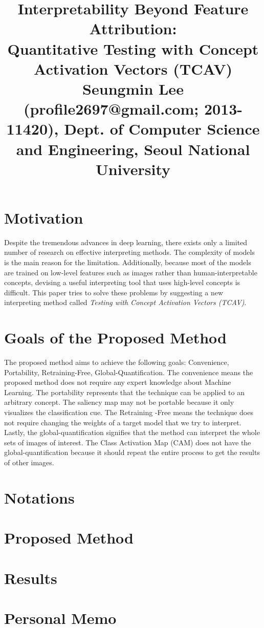 \documentclass[10pt,twocolumn,letterpaper]{article}
\begin{document}
\title{Interpretability Beyond Feature Attribution: \\Quantitative Testing with Concept Activation Vectors (TCAV)
	 \\ {\rm {\normalsize Seungmin Lee (profile2697@gmail.com; 2013-11420), Dept. of Computer Science and Engineering, Seoul National University}}} 

\maketitle
\thispagestyle{empty}


\section{Motivation}
Despite the tremendous advances in deep learning, there exists only a limited number of research on effective interpreting methods. The complexity of models is the main reason for the limitation. Additionally, because most of the models are trained on low-level features such as images rather than human-interpretable concepts, devising a useful interpreting tool that uses high-level concepts is difficult. This paper tries to solve these problems by suggesting a new interpreting method called \textit{Testing with Concept Activation Vectors (TCAV)}.

\section{Goals of the Proposed Method}
The proposed method aims to achieve the following goals: Convenience, Portability, Retraining-Free, Global-Quantification. The convenience means the proposed method does not require any expert knowledge about Machine Learning. The portability represents that the technique can be applied to an arbitrary concept. The saliency map may not be portable because it only visualizes the classification cue. The Retraining -Free means the technique does not require changing the weights of a target model that we try to interpret. Lastly, the global-quantification signifies that the method can interpret the whole sets of images of interest. The Class Activation Map (CAM) does not have the global-quantification because it should repeat the entire process to get the results of other images.

\section{Notations}


\section{Proposed Method}


\section{Results}


\section{Personal Memo}


{\small

% 
}
\end{document}

